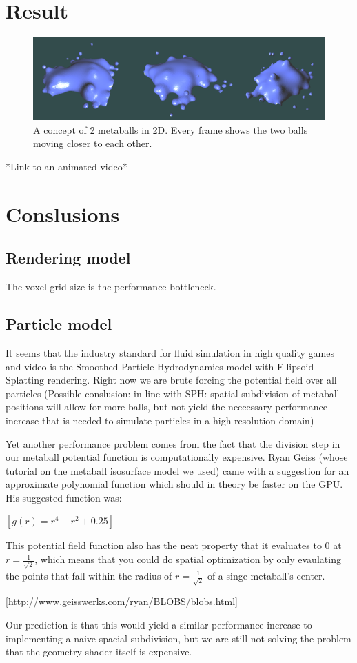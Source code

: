 \documentclass{article}
\begin{document}
    \section{Result}
        \begin{figure}[ht]
            \includegraphics[width=\linewidth]{img/result-animation.png}
            \caption{A concept of 2 metaballs in 2D. Every frame shows the two balls moving closer to each other.}
            \label{fig:result-animation}
        \end{figure}
        *Link to an animated video*

    \section{Conslusions}
    
        \subsection{Rendering model}
        The voxel grid size is the performance bottleneck.

        \subsection{Particle model}
    	It seems that the industry standard for fluid simulation in high quality games and video is the Smoothed Particle Hydrodynamics model with Ellipsoid Splatting rendering.
        Right now we are brute forcing the potential field over all particles
        (Possible conslusion: in line with SPH: spatial subdivision of metaball positions will allow for more balls, but not yield the neccessary performance increase that is needed to simulate particles in a high-resolution domain)

        Yet another performance problem comes from the fact that the division step in our metaball potential function is computationally expensive.
        Ryan Geiss (whose tutorial on the metaball isosurface model we used) came with a suggestion for an approximate polynomial function which should in theory be faster on the GPU. His suggested function was:

        $[g(r) = r^4 - r^2 + 0.25]$

        This potential field function also has the neat property that it evaluates to 0 at $r=\frac{1}{\sqrt{2}}$, which means that you could do spatial optimization by only evaulating the points that fall within the radius of $r=\frac{1}{\sqrt{2}}$ of a singe metaball's center.

        [http://www.geisswerks.com/ryan/BLOBS/blobs.html]

        Our prediction is that this would yield a similar performance increase to implementing a naive spacial subdivision, but we are still not solving the problem that the geometry shader itself is expensive.
\end{document}
